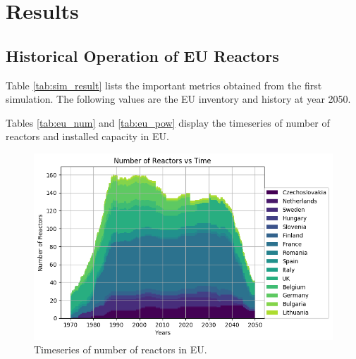 \section{Results}

\subsection{Historical Operation of EU Reactors}


\begin{table}[h]
	\centering
		\caption{Simulation Results}
		\label{tab:sim_result}
		\end {table}

Table \ref{tab:sim_result} lists the important metrics
obtained from the first simulation. The following
values are the EU inventory and history at year 2050.

Tables \ref{tab:eu_num} and \ref{tab:eu_pow} display the
timeseries of number of reactors and installed capacity in EU.



\begin{figure}[htbp!]
	\begin{center}
		\includegraphics[scale=0.7]{./images/eu_future/number_plot.png}
	\end{center}
	\caption{Timeseries of number of reactors in EU.}
	\label{fig:eu_num}
\end{figure}

